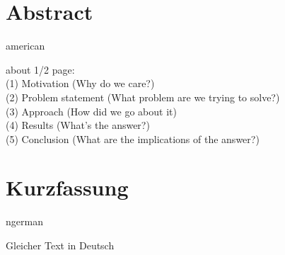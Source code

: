 \chapter*{Abstract}
\begin{otherlanguage*}{american}

about 1/2 page:   \\
(1) Motivation (Why do we care?)   \\
(2) Problem statement (What problem are we trying to solve?)   \\
(3) Approach (How did we go about it)   \\
(4) Results (What's the answer?)   \\
(5) Conclusion (What are the implications of the answer?)

\end{otherlanguage*}


\chapter*{Kurzfassung}
\begin{otherlanguage*}{ngerman}

Gleicher Text in Deutsch

\end{otherlanguage*}

